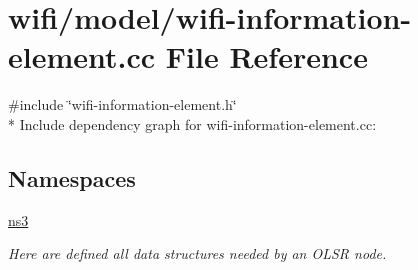 \hypertarget{wifi-information-element_8cc}{}\section{wifi/model/wifi-\/information-\/element.cc File Reference}
\label{wifi-information-element_8cc}
{\ttfamily \#include \char`\"{}wifi-\/information-\/element.\+h\char`\"{}}\\*
Include dependency graph for wifi-\/information-\/element.cc\+:
\subsection*{Namespaces}
\begin{DoxyCompactItemize}
\item 
 \hyperlink{namespacens3}{ns3}
\begin{DoxyCompactList}\small\item\em Here are defined all data structures needed by an O\+L\+SR node. \end{DoxyCompactList}\end{DoxyCompactItemize}
